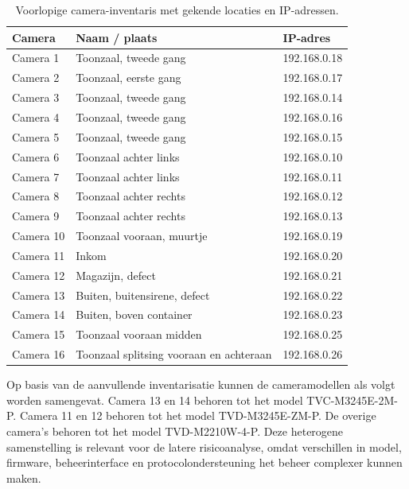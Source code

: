 \begin{table}[H]
    \centering
    \small
    \caption[Camera-inventaris met IP-adressen]{Voorlopige camera-inventaris met gekende locaties en IP-adressen.}
    \label{tab:camera-inventaris}
    \begin{tabular}{|p{}|p{}|p{}|}
        \hline
        \textbf{Camera} & \textbf{Naam / plaats} & \textbf{IP-adres} \\
        \hline
        Camera 1 & Toonzaal, tweede gang & 192.168.0.18 \\
        \hline
        Camera 2 & Toonzaal, eerste gang & 192.168.0.17 \\
        \hline
        Camera 3 & Toonzaal, tweede gang & 192.168.0.14 \\
        \hline
        Camera 4 & Toonzaal, tweede gang & 192.168.0.16 \\
        \hline
        Camera 5 & Toonzaal, tweede gang & 192.168.0.15 \\
        \hline
        Camera 6 & Toonzaal achter links & 192.168.0.10 \\
        \hline
        Camera 7 & Toonzaal achter links & 192.168.0.11 \\
        \hline
        Camera 8 & Toonzaal achter rechts & 192.168.0.12 \\
        \hline
        Camera 9 & Toonzaal achter rechts & 192.168.0.13 \\
        \hline
        Camera 10 & Toonzaal vooraan, muurtje & 192.168.0.19 \\
        \hline
        Camera 11 & Inkom & 192.168.0.20 \\
        \hline
        Camera 12 & Magazijn, defect & 192.168.0.21 \\
        \hline
        Camera 13 & Buiten, buitensirene, defect & 192.168.0.22 \\
        \hline
        Camera 14 & Buiten, boven container & 192.168.0.23 \\
        \hline
        Camera 15 & Toonzaal vooraan midden & 192.168.0.25 \\
        \hline
        Camera 16 & Toonzaal splitsing vooraan en achteraan & 192.168.0.26 \\
        \hline
    \end{tabular}
\end{table}

Op basis van de aanvullende inventarisatie kunnen de cameramodellen als volgt worden samengevat. Camera 13 en 14 behoren tot het model TVC-M3245E-2M-P. Camera 11 en 12 behoren tot het model TVD-M3245E-ZM-P. De overige camera's behoren tot het model TVD-M2210W-4-P. Deze heterogene samenstelling is relevant voor de latere risicoanalyse, omdat verschillen in model, firmware, beheerinterface en protocolondersteuning het beheer complexer kunnen maken.


